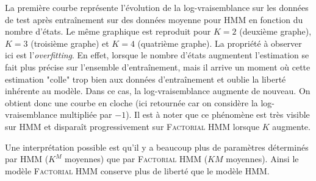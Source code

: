 \documentclass[10pt,a4paper]{article}
\newcommand{\hmm}{\textsc{HMM}}
\newcommand{\fhmm}{\textsc{Factorial HMM}}
\begin{document}
La première courbe représente l'évolution de la log-vraisemblance sur les données de test après entraînement sur des données moyenne pour \hmm{} en fonction du nombre d'états. Le même graphique est reproduit pour $K=2$ (deuxième graphe), $K=3$ (troisième graphe) et $K=4$ (quatrième graphe). La propriété à observer ici est l'\textit{overfitting}. En effet, lorsque le nombre d'états augmentent l'estimation se fait plus précise sur l'ensemble d'entraînement, mais il arrive un moment où cette estimation "colle" trop bien aux données d'entraînement et oublie la liberté inhérente au modèle. Dans ce cas, la log-vraisemblance augmente de nouveau. On obtient donc une courbe en cloche (ici retournée car on considère la log-vraisemblance multipliée par $-1$). Il est à noter que ce phénomène est très visible sur \hmm{} et disparaît progressivement sur \fhmm{} lorsque $K$ augmente. 

Une interprétation possible est qu'il y a beaucoup plus de paramètres déterminés par \hmm{} ($K^M$ moyennes) que par \fhmm{} ($KM$ moyennes). Ainsi le modèle \fhmm{} conserve plus de liberté que le modèle \hmm{}.

  
  
\end{document}
